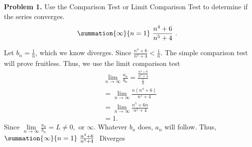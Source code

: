\documentclass{report}
\title{\Huge{}}
\author{\huge{Nathan Warner}}
\date{\huge{}}
\begin{document}
    \begin{mdframed}
        \textbf{Problem 1.}  Use the Comparison Test or Limit Comparison Test to determine if the series converges.
        \begin{align*}
            \summation{\infty}{n=1}\ \frac{n^{4} + 6}{ n^{5} + 4}\ 
        .\end{align*}
    \end{mdframed}
    \bigbreak \noindent 
    Let $b_{n} = \frac{1}{n}$, which we know diverges. Since $\frac{n^{4} + 6}{n^{5} + 4} < \frac{1}{n}$. The simple comparison test will prove fruitless. Thus, we use the limit comparison test
    \begin{align*}
        &\lim\limits_{n \to \infty}{\frac{a_{n}}{b_{n}}} = \frac{\frac{n^{4} +6}{n^{5}+4}}{\frac{1}{n}} \\
        &=\lim\limits_{n \to \infty}{\frac{n(n^{4}+6)}{n^{5}+4}} \\
        &=\lim\limits_{n \to \infty}{\frac{n^{5}+6n}{n^{5}+4}} \\
        &=1
    .\end{align*}
    \bigbreak \noindent 
    Since $\lim\limits_{n \to \infty}{\frac{a_{n}}{b_{n}}} = L \ne 0, \text{ or } \infty$. Whatever $b_{n}$ does, $a_{n}$ will follow. Thus, $\summation{\infty}{n=1}\ \frac{n^{4}+6}{n^{5}+4}\ $ Diverges
\end{document}
